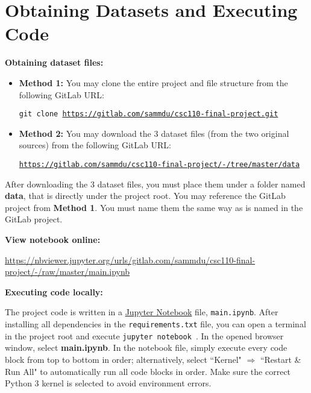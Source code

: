 \documentclass[fontsize=11pt]{article}
\begin{document}
\section*{Obtaining Datasets and Executing Code}

\textbf{Obtaining dataset files:}

\begin{itemize}
    \item \textbf{Method 1:} You may clone the entire project and file structure from the following GitLab URL:

    \qquad \texttt{git clone \url{https://gitlab.com/sammdu/csc110-final-project.git}}

    \item \textbf{Method 2:} You may download the 3 dataset files (from the two original sources) from the following GitLab URL:

    \qquad \texttt{\url{https://gitlab.com/sammdu/csc110-final-project/-/tree/master/data}}
\end{itemize}

After downloading the 3 dataset files, you must place them under a folder named \textbf{data}, that is directly under the project root. You may reference the GitLab project from \textbf{Method 1}. You must name them the same way as is named in the GitLab project.

\bigskip

\noindent \textbf{View notebook online:}

\medskip

\url{https://nbviewer.jupyter.org/urls/gitlab.com/sammdu/csc110-final-project/-/raw/master/main.ipynb}

\bigskip

\noindent \textbf{Executing code locally:}

\medskip

The project code is written in a \href{https://jupyter.readthedocs.io/en/latest/running.html}{Jupyter Notebook} file, \texttt{main.ipynb}. After installing all dependencies in the \texttt{requirements.txt} file, you can open a terminal in the project root and execute \texttt{jupyter notebook
}. In the opened browser window, select \textbf{main.ipynb}. In the notebook file, simply execute every code block from top to bottom in order; alternatively, select ``Kernel" $\Rightarrow$ ``Restart \& Run All" to automatically run all code blocks in order. Make sure the correct Python 3 kernel is selected to avoid environment errors.
\end{document}
